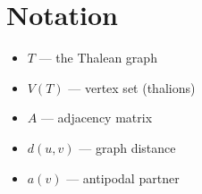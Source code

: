 \section*{Notation}

\begin{itemize}

\item $T$ — the Thalean graph

\item $V(T)$ — vertex set (thalions)

\item $A$ — adjacency matrix

\item $d(u,v)$ — graph distance

\item $a(v)$ — antipodal partner

\end{itemize}
